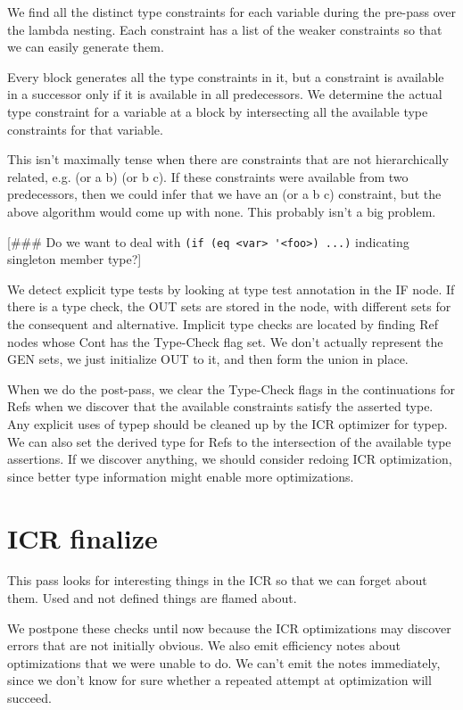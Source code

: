 We find all the distinct type constraints for each variable during the pre-pass
over the lambda nesting.  Each constraint has a list of the weaker constraints
so that we can easily generate them.

Every block generates all the type constraints in it, but a constraint is
available in a successor only if it is available in all predecessors.  We
determine the actual type constraint for a variable at a block by intersecting
all the available type constraints for that variable.

This isn't maximally tense when there are constraints that are not
hierarchically related, e.g. (or a b) (or b c).  If these constraints were
available from two predecessors, then we could infer that we have an (or a b c)
constraint, but the above algorithm would come up with none.  This probably
isn't a big problem.

[\#\#\# Do we want to deal with \verb+(if (eq <var> '<foo>) ...)+ indicating singleton
member type?]

We detect explicit type tests by looking at type test annotation in the IF
node.  If there is a type check, the OUT sets are stored in the node, with
different sets for the consequent and alternative.  Implicit type checks are
located by finding Ref nodes whose Cont has the Type-Check flag set.  We don't
actually represent the GEN sets, we just initialize OUT to it, and then form
the union in place.

When we do the post-pass, we clear the Type-Check flags in the continuations
for Refs when we discover that the available constraints satisfy the asserted
type.  Any explicit uses of typep should be cleaned up by the ICR optimizer for
typep.  We can also set the derived type for Refs to the intersection of the
available type assertions.  If we discover anything, we should consider redoing
ICR optimization, since better type information might enable more
optimizations.


\chapter{ICR finalize} %

This pass looks for interesting things in the ICR so that we can forget about
them.  Used and not defined things are flamed about.

We postpone these checks until now because the ICR optimizations may discover
errors that are not initially obvious.  We also emit efficiency notes about
optimizations that we were unable to do.  We can't emit the notes immediately,
since we don't know for sure whether a repeated attempt at optimization will
succeed.

